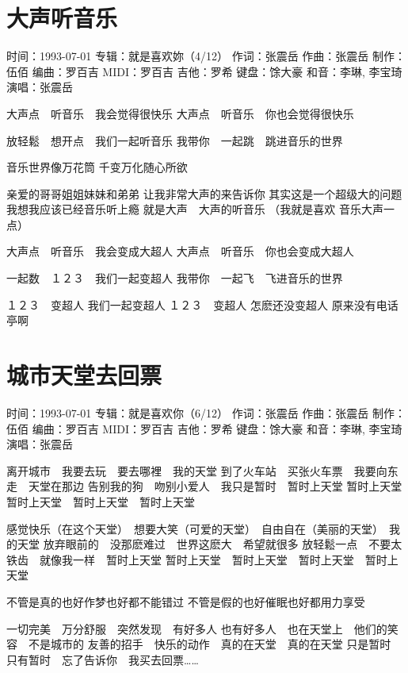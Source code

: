 \documentclass[UTF8,a4paper,oneside,twocolumn,12pt]{ctexbook}
\newcommand{\infopair}[2]{\textbullet #1：#2}
\newcommand{\zc}[1][伍佰]{\infopair{作词}{#1}}
\newcommand{\zq}[1][伍佰]{\infopair{作曲}{#1}}
\newcommand{\bq}[1][伍佰]{\infopair{编曲}{#1}}
\newcommand{\zj}[1]{\infopair{专辑}{#1}}
\newcommand{\zz}[1]{\infopair{制作}{#1}}
\newcommand{\sj}[1]{\infopair{时间}{#1}}
\newenvironment{info}{\begin{flushleft}\kaishu
	}
	{\end{flushleft}\normalsize\yahei\par}
\newenvironment{lyric}{
	}
{}
\begin{document}
\section{大声听音乐}
\begin{info}
	\sj{1993-07-01}
	\zj{就是喜欢妳（4/12）}
	\zc[张震岳]
	\zq[张震岳]
	\zz{伍佰}
	\bq[罗百吉]
	\infopair{MIDI}{罗百吉}
	\infopair{吉他}{罗希}
	\infopair{键盘}{馀大豪}
	\infopair{和音}{李琳, 李宝琦}
	\infopair{演唱}{张震岳}
\end{info}
\begin{lyric}
	大声点　听音乐　我会觉得很快乐
	大声点　听音乐　你也会觉得很快乐

	放轻鬆　想开点　我们一起听音乐
	我带你　一起跳　跳进音乐的世界

	音乐世界像万花筒
	千变万化随心所欲

	亲爱的哥哥姐姐妹妹和弟弟
	让我非常大声的来告诉你
	其实这是一个超级大的问题
	我想我应该已经音乐听上瘾
	就是大声　大声的听音乐
	（我就是喜欢 音乐大声一点）

	大声点　听音乐　我会变成大超人
	大声点　听音乐　你也会变成大超人

	一起数　１２３　我们一起变超人
	我带你　一起飞　飞进音乐的世界

	１２３　变超人 我们一起变超人
	１２３　变超人 怎麽还没变超人 原来没有电话亭啊
\end{lyric}

\section{城市天堂去回票}
\begin{info}
	\sj{1993-07-01}
	\zj{就是喜欢你（6/12）}
	\zc[张震岳]
	\zq[张震岳]
	\zz{伍佰}
	\bq[罗百吉]
	\infopair{MIDI}{罗百吉}
	\infopair{吉他}{罗希}
	\infopair{键盘}{馀大豪}
	\infopair{和音}{李琳, 李宝琦}
	\infopair{演唱}{张震岳}
\end{info}
\begin{lyric}
	离开城市　我要去玩　要去哪裡　我的天堂
	到了火车站　买张火车票　我要向东走　天堂在那边
	告别我的狗　吻别小爱人　我只是暂时　暂时上天堂
	暂时上天堂　暂时上天堂　暂时上天堂　暂时上天堂

	感觉快乐（在这个天堂）　想要大笑（可爱的天堂）　自由自在（美丽的天堂）　我的天堂
	放弃眼前的　没那麽难过　世界这麽大　希望就很多
	放轻鬆一点　不要太铁齿　就像我一样　暂时上天堂
	暂时上天堂　暂时上天堂　暂时上天堂　暂时上天堂

	不管是真的也好作梦也好都不能错过
	不管是假的也好催眠也好都用力享受

	一切完美　万分舒服　突然发现　有好多人
	也有好多人　也在天堂上　他们的笑容　不是城市的
	友善的招手　快乐的动作　真的在天堂　真的在天堂
	只是暂时　只有暂时　忘了告诉你　我买去回票……
\end{lyric}
\end{document}
